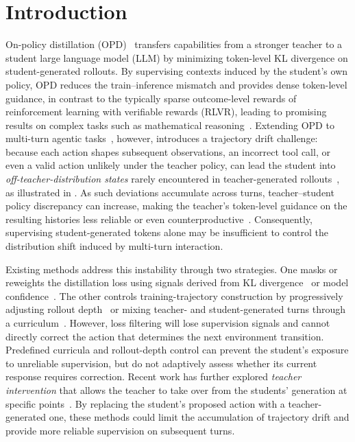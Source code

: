 \section{Introduction}
\label{sec:introduction} 

On-policy distillation (OPD)~\citep{AgarwalVZSGGB24,Gu0WH24,abs-2505-09388,abs-2512-02556,lu2025onpolicydistillation,abs-2601-18734} transfers capabilities from a stronger teacher to a student large language model (LLM) by minimizing token-level KL divergence on student-generated rollouts. By supervising contexts induced by the student's own policy, OPD reduces the train--inference mismatch and provides dense token-level guidance, in contrast to the typically sparse outcome-level rewards of reinforcement learning with verifiable rewards (RLVR), leading to promising results on complex tasks such as mathematical reasoning~\citep{lu2025onpolicydistillation,abs-2603-07079}. Extending OPD to multi-turn agentic tasks~\citep{abs-2409-12122,ShridharYCBTH21}, however, introduces a trajectory drift challenge: because each action shapes subsequent observations, an incorrect tool call, or even a valid action unlikely under the teacher policy, can lead the student into \emph{off-teacher-distribution states} rarely encountered in teacher-generated rollouts~\citep{abs-2605-07725,abs-2604-24005}, as illustrated in . As such deviations accumulate across turns, teacher--student policy discrepancy can increase, making the teacher's token-level guidance on the resulting histories less reliable or even counterproductive~\citep{abs-2604-13016}. Consequently, supervising student-generated tokens alone may be insufficient to control the distribution shift induced by multi-turn interaction. 



Existing methods address this instability through two strategies.
One masks or reweights the distillation loss using signals derived from KL divergence~\citep{abs-2605-07725,abs-2606-19659} or model confidence~\citep{abs-2604-10688}.
The other controls training-trajectory construction by progressively adjusting rollout depth~\citep{abs-2604-24005} or mixing teacher- and student-generated turns through a curriculum~\citep{abs-2606-15912}.
However, loss filtering will lose supervision signals and cannot directly correct the action that determines the next environment transition.
Predefined curricula and rollout-depth control can prevent the student's exposure to unreliable supervision, but do not adaptively assess whether its current response requires correction.
Recent work has further explored \emph{teacher intervention} that allows the teacher to take over from the students' generation at specific points~\citep{abs-2607-26057}. 
By replacing the student's proposed action with a teacher-generated one, these methods could limit the accumulation of trajectory drift and provide more reliable supervision on subsequent turns. 



